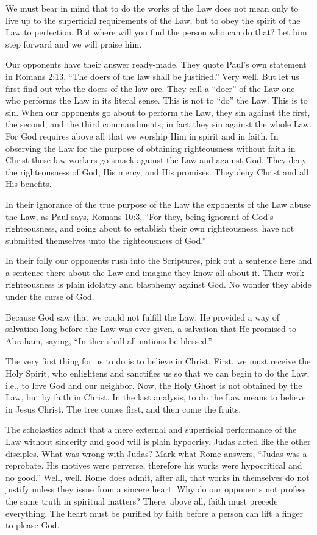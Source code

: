 We must bear in mind that to do the works of the Law does not mean only to live up to the superficial requirements of the Law, but to obey the spirit of the Law to perfection. But where will you find the person who can do that? Let him step forward and we will praise him.

Our opponents have their answer ready-made. They quote Paul’s own statement in Romans 2:13, “The doers of the law shall be justified.” Very well. But let us first find out who the doers of the law are. They call a “doer” of the Law one who performs the Law in its literal sense. This is not to “do” the Law. This is to sin. When our opponents go about to perform the Law, they sin against the first, the second, and the third commandments; in fact they sin against the whole Law. For God requires above all that we worship Him in spirit and in faith. In observing the Law for the purpose of obtaining righteousness without faith in Christ these law-workers go smack against the Law and against God. They deny the righteousness of God, His mercy, and His promises. They deny Christ and all His benefits.

In their ignorance of the true purpose of the Law the exponents of the Law abuse the Law, as Paul says, Romans 10:3, “For they, being ignorant of God’s righteousness, and going about to establish their own righteousness, have not submitted themselves unto the righteousness of God.”

In their folly our opponents rush into the Scriptures, pick out a sentence here and a sentence there about the Law and imagine they know all about it. Their work-righteousness is plain idolatry and blasphemy against God. No wonder they abide under the curse of God.

Because God saw that we could not fulfill the Law, He provided a way of salvation long before the Law was ever given, a salvation that He promised to Abraham, saying, “In thee shall all nations be blessed.”

The very first thing for us to do is to believe in Christ. First, we must receive the Holy Spirit, who enlightens and sanctifies us so that we can begin to do the Law, i.e., to love God and our neighbor. Now, the Holy Ghost is not obtained by the Law, but by faith in Christ. In the last analysis, to do the Law means to believe in Jesus Christ. The tree comes first, and then come the fruits.

The scholastics admit that a mere external and superficial performance of the Law without sincerity and good will is plain hypocrisy. Judas acted like the other disciples. What was wrong with Judas? Mark what Rome answers, “Judas was a reprobate. His motives were perverse, therefore his works were hypocritical and no good.” Well, well. Rome does admit, after all, that works in themselves do not justify unless they issue from a sincere heart. Why do our opponents not profess the same truth in spiritual matters? There, above all, faith must precede everything. The heart must be purified by faith before a person can lift a finger to please God.

